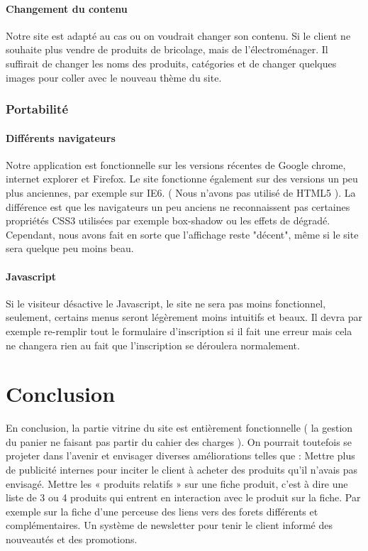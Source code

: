 \documentclass[10pt,a4paper]{article}
\begin{document}
\subsection{Changement du contenu}
	Notre site est adapté au cas ou on voudrait changer son contenu. Si le client ne souhaite plus vendre de produits de bricolage, mais de l'électroménager.
Il suffirait de changer les noms des produits, catégories et de changer quelques images pour coller avec le nouveau thème du site.	

	\section{Portabilité}

\subsection{Différents navigateurs}

	Notre application est fonctionnelle sur les versions récentes de Google chrome, internet explorer et Firefox. Le site fonctionne également sur des versions un peu plus anciennes, par exemple sur IE6. ( Nous n'avons pas utilisé de HTML5 ). La différence est que les navigateurs un peu anciens ne reconnaissent pas certaines propriétés CSS3 utilisées par exemple box-shadow ou les effets de dégradé. Cependant, nous avons fait en sorte que l'affichage reste "décent", même si le site sera quelque peu moins beau.

\subsection{Javascript}

	Si le visiteur désactive le Javascript, le site ne sera pas moins fonctionnel, seulement, certains menus seront légèrement moins intuitifs et beaux. Il devra par exemple re-remplir tout le formulaire d'inscription si il fait une erreur mais cela ne changera rien au fait que l'inscription se déroulera normalement.

	\newpage
	\part{Conclusion}
	En conclusion, la partie vitrine du site est entièrement fonctionnelle ( la gestion du panier ne faisant pas partir du cahier des charges ). On pourrait toutefois se projeter dans l'avenir et envisager diverses améliorations telles que :
Mettre plus de publicité internes pour inciter le client à acheter des produits qu'il n'avais pas envisagé.
Mettre les « produits relatifs » sur une fiche produit, c'est à dire une liste de 3 ou 4 produits qui entrent en interaction avec le produit sur la fiche. Par exemple sur la fiche d'une perceuse des liens vers des forets différents et complémentaires.
Un système de newsletter pour tenir le client informé des nouveautés et des promotions.
\end{document}
